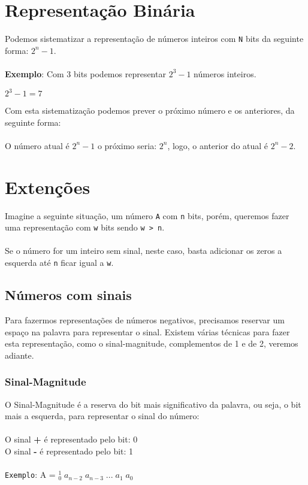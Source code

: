 \documentclass[12pt, onecolumn]{article}
\begin{document}
	\section{Representação Binária}
	Podemos sistematizar a representação de números inteiros com \texttt{N} bits
	da seguinte forma: $2^{n} - 1$. \\
	\\
	\textbf{Exemplo}: Com 3 bits podemos representar $2^{3} - 1$ números inteiros.
			\begin{center} 
				$2^{3} - 1 = 7$ \\
			\end{center}
	Com esta sistematização podemos prever o próximo número e os anteriores, 
	da seguinte forma: \\
	\\
	O número atual é $2^{n} - 1$ o próximo seria: $2^{n}$, logo, o anterior
	do atual é $2^{n} - 2$.

	\section{Extenções}
	Imagine a seguinte situação, um número \texttt{A} com \texttt{n} bits, porém,
	queremos fazer uma representação com \texttt{w} bits sendo \texttt{w > n}.\\
	\\
	Se o número for um inteiro sem sinal, neste caso, basta adicionar os zeros
	a esquerda até \texttt{n} ficar igual a \texttt{w}.
	
		\subsection{Números com sinais}
	Para fazermos representações de números negativos, precisamos reservar um espaço
	na palavra para representar o sinal. Existem várias técnicas para fazer esta 
	representação, como o sinal-magnitude, complementos de 1 e de 2, veremos
	adiante.

		\subsubsection{Sinal-Magnitude}
	O Sinal-Magnitude é a reserva do bit mais significativo da palavra, ou seja, 
	o bit mais a esquerda, para representar o sinal do número: \\
	\\
	O sinal \textbf{+} é representado pelo bit: 0\\
	O sinal \textbf{-} é representado pelo bit: 1\\
	\\
	\texttt{Exemplo}: A = ${_0^1}\;a_{n-2}\;a_{n-3}\;...\;a_1\;a_0$
	
\end{document}

